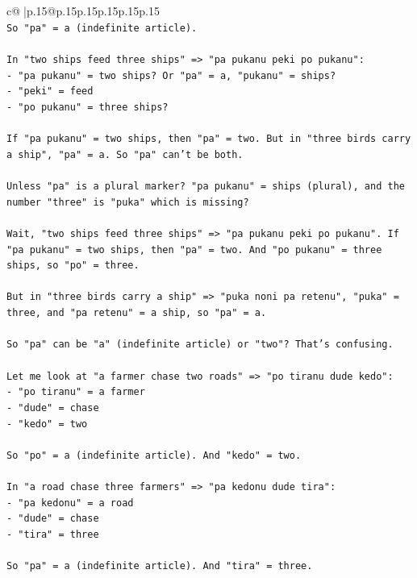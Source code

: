 \documentclass{article}
\begin{document}
{\begin{supertabular}{c@{$\;$}|p{.15\linewidth}@{}p{.15\linewidth}p{.15\linewidth}p{.15\linewidth}p{.15\linewidth}p{.15\linewidth}}
{{{\\ 
\texttt{So "pa" = a (indefinite article).} \\
\\ 
\texttt{In "two ships feed three ships" => "pa pukanu peki po pukanu":} \\
\texttt{{-} "pa pukanu" = two ships? Or "pa" = a, "pukanu" = ships?} \\
\texttt{{-} "peki" = feed} \\
\texttt{{-} "po pukanu" = three ships?} \\
\\ 
\texttt{If "pa pukanu" = two ships, then "pa" = two. But in "three birds carry a ship", "pa" = a. So "pa" can't be both.} \\
\\ 
\texttt{Unless "pa" is a plural marker? "pa pukanu" = ships (plural), and the number "three" is "puka" which is missing?} \\
\\ 
\texttt{Wait, "two ships feed three ships" => "pa pukanu peki po pukanu". If "pa pukanu" = two ships, then "pa" = two. And "po pukanu" = three ships, so "po" = three.} \\
\\ 
\texttt{But in "three birds carry a ship" => "puka noni pa retenu", "puka" = three, and "pa retenu" = a ship, so "pa" = a.} \\
\\ 
\texttt{So "pa" can be "a" (indefinite article) or "two"? That's confusing.} \\
\\ 
\texttt{Let me look at "a farmer chase two roads" => "po tiranu dude kedo":} \\
\texttt{{-} "po tiranu" = a farmer} \\
\texttt{{-} "dude" = chase} \\
\texttt{{-} "kedo" = two} \\
\\ 
\texttt{So "po" = a (indefinite article). And "kedo" = two.} \\
\\ 
\texttt{In "a road chase three farmers" => "pa kedonu dude tira":} \\
\texttt{{-} "pa kedonu" = a road} \\
\texttt{{-} "dude" = chase} \\
\texttt{{-} "tira" = three} \\
\\ 
\texttt{So "pa" = a (indefinite article). And "tira" = three.} \\
}}}
\end{supertabular}}
\end{document}
